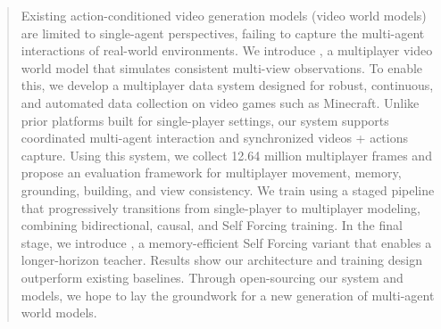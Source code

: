 \begin{abstract}
Existing action-conditioned video generation models (video world models) are limited to single-agent perspectives, failing to capture the multi-agent interactions of real-world environments. We introduce \solaris, a multiplayer video world model that simulates consistent multi-view observations. To enable this, we develop a multiplayer data system designed for robust, continuous, and automated data collection on video games such as Minecraft. Unlike prior platforms built for single-player settings, our system supports coordinated multi-agent interaction and synchronized videos + actions capture. Using this system, we collect 12.64 million multiplayer frames and propose an evaluation framework for multiplayer movement, memory, grounding, building, and view consistency. We train \solaris using a staged pipeline that progressively transitions from single-player to multiplayer modeling, combining bidirectional, causal, and Self Forcing training. In the final stage, we introduce \emph{\oursf}, a memory-efficient Self Forcing variant that enables a longer-horizon teacher. Results show our architecture and training design outperform existing baselines. Through open-sourcing our system and models, we hope to lay the groundwork for a new generation of multi-agent world models.
\end{abstract}
